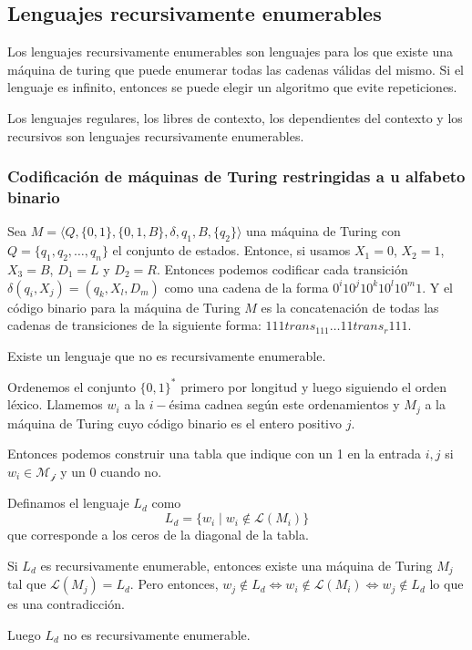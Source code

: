 \subsection{Lenguajes recursivamente enumerables}
Los lenguajes recursivamente enumerables son lenguajes para los que existe una máquina de turing que puede enumerar todas las cadenas válidas del mismo. Si el lenguaje es infinito, entonces se puede elegir un algoritmo que evite repeticiones.

Los lenguajes regulares, los libres de contexto, los dependientes del contexto y los recursivos son lenguajes recursivamente enumerables.

\subsubsection*{Codificación de máquinas de Turing restringidas a u alfabeto binario}

Sea \(M = \langle Q, \{0,1\}, \{0,1,B\}, \delta, q_1, B,\{q_2\}\rangle\) una máquina de Turing con \(Q = \{q_1, q_2,\dots,q_n\}\) el conjunto de estados. Entonce, si usamos \(X_1 = 0\), \(X_2 = 1\), \(X_3 = B\), \(D_1 = L\) y \(D_2 = R\). Entonces podemos codificar cada transición \(\delta(q_i, X_j) = (q_k, X_l, D_m)\) como una cadena de la forma \(0^i10^j10^k10^l10^m 1\). Y el código binario para la máquina de Turing \(M\) es la concatenación de todas las cadenas de transiciones de la siguiente forma: \(111trans_111\dots11trans_r111\).

\begin{teorema}
  Existe un lenguaje que no es recursivamente enumerable.
\end{teorema}
\begin{demo}[0.8\textwidth]
  Ordenemos el conjunto \(\{0,1\}^*\) primero por longitud y luego siguiendo el orden léxico. Llamemos \(w_i\) a la \(i-\)ésima cadnea según este ordenamientos y \(M_j\) a la máquina de Turing cuyo código binario es el entero positivo \(j\).

  Entonces podemos construir una tabla que indique con un 1 en la entrada \(i,j\) si \(w_i\in\mathcal{M_j}\) y un 0 cuando no.

  Definamos el lenguaje \(L_d\) como \[ L_d = \{w_i \mid w_i\notin \mathcal{L}(M_i)\}\] que corresponde a los ceros de la diagonal de la tabla.

  Si \(L_d\) es recursivamente enumerable, entonces existe una máquina de Turing \(M_j\) tal que \(\mathcal{L}(M_j) = L_d\). Pero entonces, \(w_j\notin L_d \iff w_i \notin \mathcal{L}(M_i) \iff w_j\notin L_d\) lo que es una contradicción.

  Luego \(L_d\) no es recursivamente enumerable.
\end{demo}

